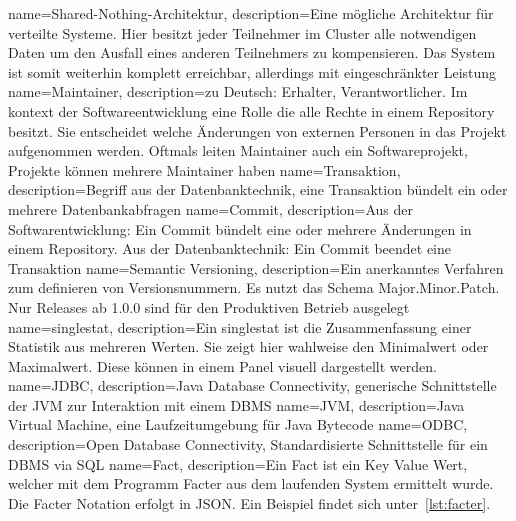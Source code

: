 {
  name=Shared-Nothing-Architektur,
  description={Eine mögliche Architektur für verteilte Systeme. Hier besitzt
               jeder Teilnehmer im Cluster alle notwendigen Daten um den
               Ausfall eines anderen Teilnehmers zu kompensieren. Das
               System ist somit weiterhin komplett erreichbar, allerdings mit
               eingeschränkter Leistung}
}
{
  name=Maintainer,
  description={zu Deutsch: Erhalter, Verantwortlicher. Im kontext der
               Softwareentwicklung eine Rolle die alle Rechte in einem
               \gls{Repository} besitzt. Sie entscheidet welche Änderungen von
               externen Personen in das Projekt aufgenommen werden. Oftmals
               leiten Maintainer auch ein Softwareprojekt, Projekte können
               mehrere Maintainer haben}
}
{
  name=Transaktion,
  description={Begriff aus der Datenbanktechnik, eine Transaktion bündelt ein
               oder mehrere Datenbankabfragen}
}
{
  name=Commit,
  description={Aus der Softwarentwicklung: Ein Commit bündelt eine oder mehrere
               Änderungen in einem \gls{Repository}. Aus der Datenbanktechnik:
               Ein Commit beendet eine \gls{Transaktion}}
}
{
  name={Semantic Versioning},
  description={Ein anerkanntes Verfahren zum definieren von Versionsnummern. Es
               nutzt das Schema Major.Minor.Patch. Nur Releases ab 1.0.0 sind
               für den Produktiven Betrieb ausgelegt~\cite{semver}}
}
{
  name={singlestat},
  description={Ein singlestat ist die Zusammenfassung einer Statistik aus mehreren
              Werten. Sie zeigt hier wahlweise den Minimalwert oder Maximalwert.
              Diese können in einem Panel visuell dargestellt werden.}
}
{
  name=JDBC,
  description={Java Database Connectivity, generische Schnittstelle der JVM zur
               Interaktion mit einem \gls{DBMS}}
}
{
  name=JVM,
  description={Java Virtual Machine, eine Laufzeitumgebung für Java Bytecode}
}
{
  name=ODBC,
  description={Open Database Connectivity, Standardisierte Schnittstelle für
               ein \gls{DBMS} via \gls{SQL}}
}
{
  name=Fact,
  description={Ein Fact ist ein Key Value Wert, welcher mit dem Programm Facter
               aus dem laufenden System ermittelt wurde. Die Facter Notation
               erfolgt in \gls{JSON}. Ein Beispiel findet sich
               unter~\ref{lst:facter}.}
}
